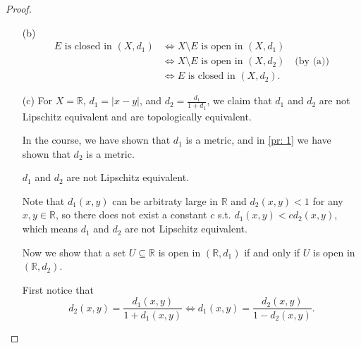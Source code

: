 \begin{proof}
\begin{itemize}
\begin{itemize}
      \item [\((\impliedby )\)] Since we know 
      \[
        \frac{1}{C_2} d_1(x, y) \le d_2(x,y) \le \frac{1}{C_1} d_1(x,y) \quad \forall x,y \in X,
      \] so we can just use the same method in the \((\implies )\)'s proof to prove \((\impliedby )\) direction.  
    \end{itemize}
    \item [(b)] 
    \begin{align*}
      E \text{ is closed in } (X, d_1) &\iff X \setminus E \text{ is open in } (X, d_1) \\
      & \iff X \setminus E \text{ is open in }(X, d_2) \quad \text{(by (a))} \\
      &\iff E \text{ is closed in } (X, d_2).
    \end{align*}
    \item [(c)] For \(X = \mathbb{R} \), \(d_1 = \vert x-y \vert \), and \(d_2 = \frac{d_1}{1 + d_1}\), we claim that \(d_1\) and \(d_2\) are not Lipschitz equivalent and are topologically equivalent. 
    \begin{note}
        In the course, we have shown that \(d_1\) is a metric, and in \autoref{pr: 1} we have shown that \(d_2\) is a metric. 
    \end{note}
    \begin{claim}
      \(d_1\) and \(d_2\) are not Lipschitz equivalent. 
    \end{claim}
    \begin{explanation}
      Note that \(d_1(x, y)\) can be arbitraty large in \(\mathbb{R} \) and \(d_2(x, y) < 1\) for any \(x, y \in \mathbb{R} \), so there does not exist a constant \(c\) s.t. \(d_1(x, y) < c d_2(x, y)\), which means \(d_1\) and \(d_2\) are not Lipschitz equivalent.    
    \end{explanation}
    Now we show that a set \(U \subseteq \mathbb{R} \) is open in \((\mathbb{R} , d_1)\) if and only if \(U\) is open in \((\mathbb{R} , d_2)\).

          First notice that 
      \[
        d_2(x, y) = \frac{d_1(x, y)}{1 + d_1(x, y)} \iff d_1(x, y) = \frac{d_2(x,y)}{1 - d_2(x,y)}.
      \]


\end{itemize}
\end{proof}
